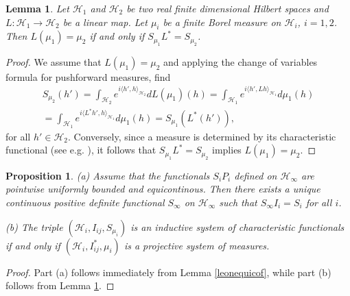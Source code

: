 \documentclass[11pt,reqno]{amsart}
\numberwithin{equation}{section}
\newtheorem{lemma}[theorem]{Lemma}
\newtheorem{proposition}[theorem]{Proposition}
\theoremstyle{remark}
\theoremstyle{rmdefinition}
\begin{document}
\begin{lemma}\label{funcpropcharfu}
Let $\mathcal{H}_1$ and $\mathcal{H}_2$ be two  real finite dimensional Hilbert spaces and $L: \mathcal{H}_1 \rightarrow \mathcal{H}_2$ be a linear map. Let $\mu_i$ be a finite Borel measure on $\mathcal{H}_i$, $i=1,2$. Then $L(\mu_1)=\mu_2$ if and only if $S_{\mu_1}L^*=S_{\mu_2}$.
\end{lemma}
\begin{proof}
We assume that $L(\mu_1)=\mu_2$ and applying the change of variables formula for pushforward measures, find
	\begin{multline*}
		S_{\mu_2}(h')=\int_{\mathcal{H}_2}e^{i\langle h', h\rangle_{\mathcal{H}_2}} dL(\mu_1)(h)=\int_{\mathcal{H}_1}e^{i\langle h', Lh\rangle_{\mathcal{H}_1}} d\mu_1(h)\\
		=\int_{\mathcal{H}_1}e^{i\langle L^*h', h\rangle_{\mathcal{H}_1}}d\mu_1(h)=
		S_{\mu_1}(L^*(h')),
	\end{multline*}
 for all  $h' \in \mathcal{H}_2$. Conversely, since a measure is determined by its characteristic functional (see e.g. \cite[Lemma 7.13.5]{B}), it follows that $S_{\mu_1}L^*=S_{\mu_2}$ implies $L(\mu_1)=\mu_2$.
\end{proof}

\begin{proposition}\label{prooncharfu} (a) Assume that the functionals $S_iP_i$ defined on $\mathcal{H}_{\infty}$ are pointwise uniformly bounded and equicontinous. Then there exists a unique continuous positive definite functional $S_{\infty}$ on $\mathcal{H}_{\infty}$ such that $S_{\infty}I_i=S_i$ for all $i$.
	
(b) The triple $(\mathcal{H}_i,I_{ij},S_{\mu_i})$ is an inductive system of characteristic functionals if and only if $(\mathcal{H}_i,I_{ij}^{*},\mu_i)$ is a  projective system of measures.
\end{proposition}
\begin{proof}
Part (a) follows immediately from Lemma \ref{leonequicof}, while part (b) follows from Lemma \ref{funcpropcharfu}.
\end{proof}
\end{document}
